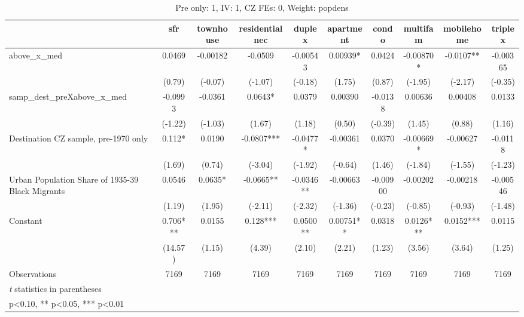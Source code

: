 \begin{table}[htbp]\centering
\def\sym#1{\ifmmode^{#1}\else\(^{#1}\)\fi}
\caption{Pre only: 1, IV: 1, CZ FEs: 0, Weight: popdens}
\begin{tabular}{l*{9}{c}}
\toprule
                    &\multicolumn{1}{c}{sfr}&\multicolumn{1}{c}{townhouse}&\multicolumn{1}{c}{residentialnec}&\multicolumn{1}{c}{duplex}&\multicolumn{1}{c}{apartment}&\multicolumn{1}{c}{condo}&\multicolumn{1}{c}{multifam}&\multicolumn{1}{c}{mobilehome}&\multicolumn{1}{c}{triplex}\\
\midrule
above\_x\_med         &      0.0469   &    -0.00182   &     -0.0509   &    -0.00543   &     0.00939*  &      0.0424   &    -0.00870*  &     -0.0107** &    -0.00365   \\
                    &      (0.79)   &     (-0.07)   &     (-1.07)   &     (-0.18)   &      (1.75)   &      (0.87)   &     (-1.95)   &     (-2.17)   &     (-0.35)   \\
\addlinespace
samp\_dest\_preXabove\_x\_med&     -0.0993   &     -0.0361   &      0.0643*  &      0.0379   &     0.00390   &     -0.0138   &     0.00636   &     0.00408   &      0.0133   \\
                    &     (-1.22)   &     (-1.03)   &      (1.67)   &      (1.18)   &      (0.50)   &     (-0.39)   &      (1.45)   &      (0.88)   &      (1.16)   \\
\addlinespace
Destination CZ sample, pre-1970 only&       0.112*  &      0.0190   &     -0.0807***&     -0.0477*  &    -0.00361   &      0.0370   &    -0.00669*  &    -0.00627   &     -0.0118   \\
                    &      (1.69)   &      (0.74)   &     (-3.04)   &     (-1.92)   &     (-0.64)   &      (1.46)   &     (-1.84)   &     (-1.55)   &     (-1.23)   \\
\addlinespace
Urban Population Share of 1935-39 Black Migrants&      0.0546   &      0.0635*  &     -0.0665** &     -0.0346** &    -0.00663   &    -0.00900   &    -0.00202   &    -0.00218   &    -0.00546   \\
                    &      (1.19)   &      (1.95)   &     (-2.11)   &     (-2.32)   &     (-1.36)   &     (-0.23)   &     (-0.85)   &     (-0.93)   &     (-1.48)   \\
\addlinespace
Constant            &       0.706***&      0.0155   &       0.128***&      0.0500** &     0.00751** &      0.0318   &      0.0126***&      0.0152***&      0.0115   \\
                    &     (14.57)   &      (1.15)   &      (4.39)   &      (2.10)   &      (2.21)   &      (1.23)   &      (3.56)   &      (3.64)   &      (1.25)   \\
\midrule
Observations        &        7169   &        7169   &        7169   &        7169   &        7169   &        7169   &        7169   &        7169   &        7169   \\
\bottomrule
\multicolumn{10}{l}{\footnotesize \textit{t} statistics in parentheses}\\
\multicolumn{10}{l}{\footnotesize * p<0.10, ** p<0.05, *** p<0.01}\\
\end{tabular}
\end{table}
